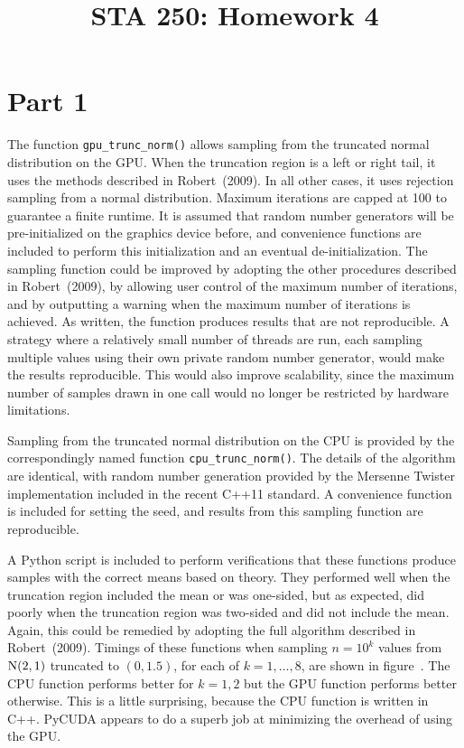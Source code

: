

\pagestyle{name}
\title{STA 250: Homework 4}


\chapter*{Part 1}
The function \texttt{gpu\_trunc\_norm()} allows sampling from the truncated
normal distribution on the GPU.
When the truncation region is a left or right tail, it uses the methods
described in Robert~(2009).
In all other cases, it uses rejection sampling from a normal distribution.
Maximum iterations are capped at 100 to guarantee a finite runtime.
It is assumed that random number generators will be pre-initialized on the
graphics device before, and convenience functions are included to perform this
initialization and an eventual de-initialization.
The sampling function could be improved by adopting the other procedures
described in Robert~(2009),
by allowing user control of the maximum number of iterations,
and by outputting a warning when the maximum number of iterations is achieved.
As written, the function produces results that are not reproducible.
A strategy where a relatively small number of threads are run,
each sampling multiple values using their own private random number generator,
would make the results reproducible.
This would also improve scalability, since the maximum number of samples drawn
in one call would no longer be restricted by hardware limitations.

Sampling from the truncated normal distribution on the CPU is provided by
the correspondingly named function \texttt{cpu\_trunc\_norm()}.
The details of the algorithm are identical,
with random number generation provided by the Mersenne Twister implementation
included in the recent C++11 standard.
A convenience function is included for setting the seed,
and results from this sampling function are reproducible.

A Python script is included to perform verifications that these functions
produce samples with the correct means based on theory.
They performed well when the truncation region included the mean or was
one-sided, but as expected, did poorly when the truncation region was
two-sided and did not include the mean.
Again, this could be remedied by adopting the full algorithm described in
Robert~(2009).
Timings of these functions when sampling $n = 10^k$ values from
$\operatorname{N}(2, 1)$ truncated to $(0, 1.5)$, for each of $k = 1, \ldots, 8$,
are shown in figure~.
The CPU function performs better for $k = 1, 2$ but the GPU function performs
better otherwise.
This is a little surprising, because the CPU function is written in C++.
PyCUDA appears to do a superb job at minimizing the overhead of using the GPU.

